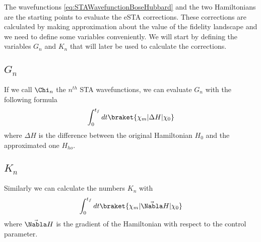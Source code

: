 The wavefunctions \cref{eq:STAWavefunctionBoseHubbard} and the two Hamiltonians are the starting points to evaluate the eSTA corrections.
These corrections are calculated by making approximation about the value of the fidelity landscape and we need to define some variables conveniently.
We will start by defining the variables $G_n$ and $ K_{n} $ that will later be used to calculate the corrections.
\subsection*{$ G_{n} $ }
If we call $ \Chi_{n} $ the $ n^{th} $ STA wavefunctions, we can evaluate $ G_n $ with the following formula
\begin{equation}
	\int_{0}^{t_{f}} dt \braket{\chi_{m}|\Delta H |\chi_{0}}
	\label{eq:Gn}
\end{equation}
where $ \Delta H $ is the difference between the original Hamiltonian $ H_{0} $ and the approximated one $ H_{ho} $.
\subsection*{$ K_{n} $ }
Similarly we can calculate the numbers $ K_{n} $ with
\begin{equation}
	\int_{0}^{t_{f}} dt \braket{\chi_{m}|\vec{\Nabla} H|\chi_{0}}
	\label{eq:Gn}
\end{equation}
where $ \vec{\Nabla} H$ is the gradient of the Hamiltonian with respect to the control parameter.


